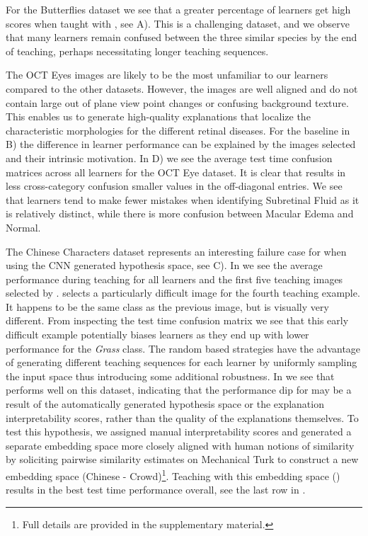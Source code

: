 \documentclass[../main.tex]{subfiles}
\begin{document}
For the Butterflies dataset we see that a greater percentage of learners get high scores when taught with \EXPLAIN, see  A). 
This is a challenging dataset, and we observe that many learners remain confused between the three similar species by the end of teaching, perhaps necessitating longer teaching sequences. 

The OCT Eyes images are likely to be the most unfamiliar to our learners compared to the other datasets.
However, the images are well aligned and do not contain large out of plane view point changes or confusing background texture. 
This enables us to generate high-quality explanations that localize the characteristic morphologies for the different retinal diseases. 
For the \RANDIM baseline in  B) the difference in learner performance can be explained by the images selected and their intrinsic motivation.
In  D) we see the average test time confusion matrices across all learners for the OCT Eye dataset.
It is clear that \EXPLAIN results in less cross-category confusion \ie smaller values in the off-diagonal entries.
We see that learners tend to make fewer mistakes when identifying Subretinal Fluid as it is relatively distinct, while there is more confusion between Macular Edema and Normal. 

The Chinese Characters dataset represents an interesting failure case for \EXPLAIN when using the CNN generated hypothesis space, see  C). 
In  we see the average performance during teaching for all learners and the first five teaching images selected by \EXPLAIN. 
\EXPLAIN selects a particularly difficult image for the fourth teaching example.
It happens to be the same class as the previous image, but is visually very different.
From inspecting the test time confusion matrix we see that this early difficult example potentially biases learners as they end up with lower performance for the \emph{Grass} class. 
The random based strategies have the advantage of generating different teaching sequences for each learner by uniformly sampling the input space thus introducing some additional robustness.
In  we see that \RANDEXP performs well on this dataset, indicating that the performance dip for \EXPLAIN may be a result of the automatically generated hypothesis space or the explanation interpretability scores, rather than the quality of the explanations themselves.
To test this hypothesis, we assigned manual interpretability scores and generated a separate embedding space more closely aligned with human notions of similarity by soliciting pairwise similarity estimates  on Mechanical Turk to construct a new embedding space (Chinese -  Crowd)\footnote{Full details are provided in the supplementary material.}.
Teaching with this embedding space (\EXPLAINCROWD) results in the best test time performance overall, see the last row in .  
\end{document}
